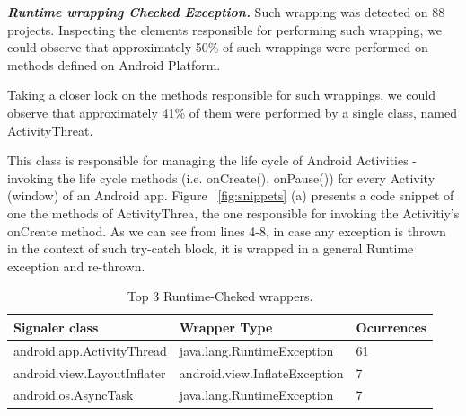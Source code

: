 \documentclass[conference]{IEEEtran}
\begin{document}
\emph{\textbf{Runtime wrapping Checked Exception.}} Such wrapping was 
detected on 88 projects. Inspecting the 
elements responsible for performing such wrapping, we could observe that
approximately  50\% of such wrappings were performed on methods defined on Android
Platform. 

Taking a closer look on the methods responsible for such wrappings,
 we could observe that approximately 41\% of them were performed by a single class,
 named ActivityThreat. 

This class is responsible for managing the life cycle of  Android Activities - 
invoking the life cycle methods (i.e. onCreate(), onPause()) for every Activity 
(window) of an Android app.
Figure ~\ref{fig:snippets} (a) presents a code snippet of one the methods of 
ActivityThrea,  the one responsible for invoking the Activitiy's onCreate method. 
As we can see from lines 4-8,
 in case any exception is thrown in the context of such try-catch block, 
it is wrapped in a general Runtime exception and re-thrown.

\begin{table}
\centering
\begin{tabular}{lll}
    \hline
 \bfseries{Signaler class} &  \bfseries{Wrapper Type} & \bfseries{Ocurrences} \\
    \hline
android.app.ActivityThread & java.lang.RuntimeException & 61\\
android.view.LayoutInflater & android.view.InflateException &  7 \\
android.os.AsyncTask & java.lang.RuntimeException &  7\\
\hline
  \end{tabular}
\caption{Top 3 Runtime-Cheked wrappers.}
\label{tab:wrapping01}
\end{table}


\end{document}

